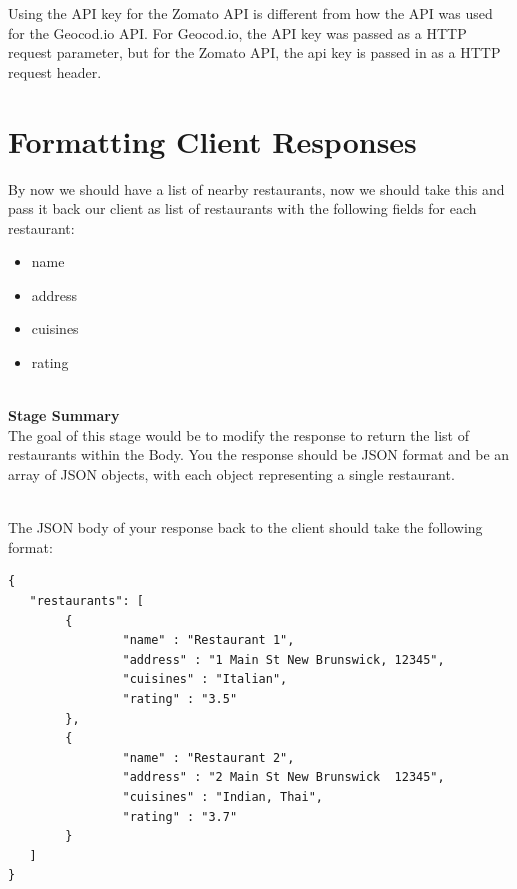 \documentclass{article}
\newenvironment{info}[1][Info:]{ %
	\medskip
	\begin{mdframed}[style=info]
		\noindent{\textbf{#1}}
}{
	\end{mdframed}
}
\begin{document}
\begin{info}[API Key Usage:]
Using the API key for the Zomato API is different from how the API was used for the Geocod.io API. For Geocod.io, the API key was passed as a HTTP request parameter, but for the Zomato API, the api key is passed in as a HTTP request header. 
\end{info}





\section{Formatting Client Responses}
By now we should have a list of nearby restaurants, now we should take this and pass it back our client as list of restaurants with the following fields for each restaurant:
\begin{itemize}
\item name
\item address
\item cuisines
\item rating
\end{itemize}

\-\ \\
\textbf{Stage Summary}\\
The goal of this stage would be to modify the response to return the list of restaurants within the Body. You the response should be JSON format and be an array of JSON objects, with each object representing a single restaurant. 

\-\ \\
The JSON body of your response back to the client should take the following format:

\begin{verbatim}
{ 
   "restaurants": [
        { 
                "name" : "Restaurant 1",  
                "address" : "1 Main St New Brunswick, 12345", 
                "cuisines" : "Italian", 
                "rating" : "3.5" 
        },
        { 
                "name" : "Restaurant 2", 
                "address" : "2 Main St New Brunswick  12345", 
                "cuisines" : "Indian, Thai", 
                "rating" : "3.7" 
        }
   ]
}
\end{verbatim}


\end{document}
